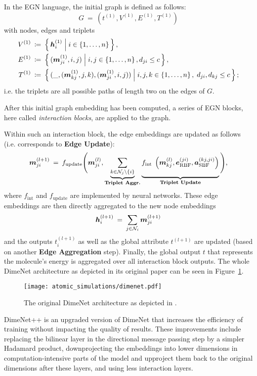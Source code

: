 In the EGN language, the initial graph is defined as follows:
\[
    G \: = \: (t^{(1)}, V^{(1)}, E^{(1)}, T^{(1)})
\]
with nodes, edges and triplets
\begin{align*}
    V^{(1)} \: &\coloneqq \: \left\{\, \boldsymbol{h}_i^{(1)} \; \middle| \; i \in \left\{1, \dots, n\right\} \,\right\}, \\
    E^{(1)} \: &\coloneqq \: \left\{\, (\boldsymbol{m}_{ji}^{(1)}, i, j) \; \middle| \; i, j \in \left\{1, \dots, n\right\}, d_{ji} \leq c \,\right\}, \\
    T^{(1)} \: &\coloneqq \: \left\{\, (\_,(\boldsymbol{m}_{kj}^{(1)}, j, k), (\boldsymbol{m}_{ji}^{(1)}, i, j)) \; \middle| \; i, j, k \in \left\{1, \dots, n\right\}, \; d_{ji}, d_{kj} \leq c \,\right\} \text{;}
\end{align*}
i.e. the triplets are all possible paths of length two on the edges of $G$.

After this initial graph embedding has been computed, a series of EGN blocks,
here called \textit{interaction blocks}, are applied to the graph.

Within such an interaction block, the edge embeddings 
are updated as follows (i.e. corresponds to \textbf{Edge Update}):
\[
    \mm_{ji}^{(l+1)} \: = \: 
    f_{\text{update}}\Bigg(\mm_{ji}^{(l)}, 
    \underbrace{\sum_{k \in \mathcal{N}_{j} \backslash\{i\}}}_{\textbf{Triplet Aggr.}} 
    \underbrace{ \vphantom{\sum_{\mathcal{N}_j}} 
    f_{\text {int }}\left(\mm_{k j}^{(l)}, \ee_{\text{RBF}}^{(ji)}, 
    \aaa_{\text{SBF}}^{(kj, ji)}\right)}
    _{\textbf{Triplet Update}}\Bigg) \text{,}
\]
where $f_{\text{int}}$ and $f_{\text{update}}$ are implemented by neural networks.
These edge embeddings are then directly aggregated to the new node embeddings
\[
    \boldsymbol{h}_i^{(l+1)} \: = \: \sum_{j \in \mathcal{N}_i} \boldsymbol{m}_{ji}^{(l+1)}
\]
and the outputs $t^{(l+1)}_i$ as well as the global attribute $t^{(l+1)}$ are
updated (based on another \textbf{Edge Aggregation} step).
Finally, the global output $t$ that represents the molecule's energy is 
aggregated over all interaction block outputs.
The whole DimeNet architecture as depicted in its original paper 
\cite{DBLP:journals/corr/abs-2003-03123} can be seen in Figure~\ref{fig:dimenet}.

\begin{figure}[H]
    \centering
    \texttt{[image: atomic\_simulations/dimenet.pdf]}
    \caption{The original DimeNet architecture as depicted in \cite*{DBLP:journals/corr/abs-2003-03123}.}
    \label{fig:dimenet}
\end{figure}

DimeNet++ \cite{https://doi.org/10.48550/arxiv.2011.14115} is an upgraded version of 
DimeNet that increases the efficiency of training without impacting the quality of results. 
These improvements include replacing the bilinear layer in the directional message passing 
step by a simpler Hadamard product, downprojecting the embeddings into lower dimensions in
computation-intensive parts of the model and upproject them back to the original dimensions 
after these layers, and using less interaction layers.

